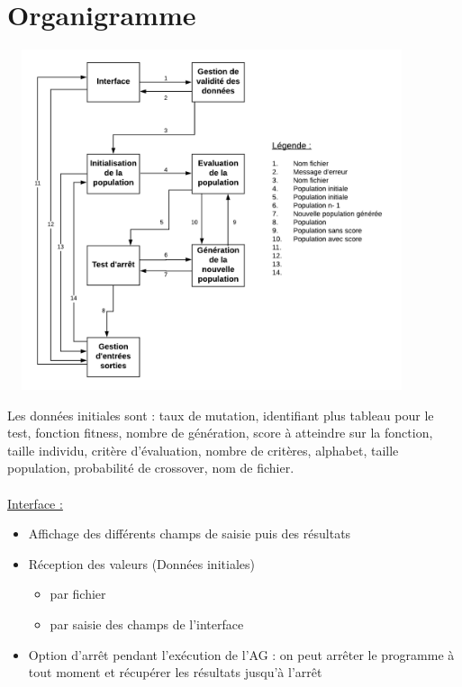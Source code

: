 \documentclass[a4paper,11pt]{article}
\begin{document}
	\section{Organigramme}
		\centerline{\includegraphics[width = 12cm,height = 10cm]{OrganigrammeV4.png}}
		
		Les données initiales sont : 	taux de mutation, 
										identifiant plus tableau pour le test, 
										fonction fitness, 
										nombre de génération, 
										score à atteindre sur la fonction, 
										taille individu, 
										critère d’évaluation, 
										nombre de critères, 
										alphabet, 
										taille population, probabilité de crossover, 
										nom de fichier.\\
		\\
		\underline{Interface :}
			\begin{itemize}
			\item Affichage des différents champs de saisie puis des résultats
			\item Réception des valeurs (Données initiales)
				\begin{itemize}
				\item par fichier
				\item par saisie des champs de l'interface
				\end{itemize}
			\item Option d’arrêt pendant l'exécution de l’AG : on peut arrêter le programme à tout moment et récupérer les résultats jusqu’à l’arrêt\\
			\end{itemize}
		
\end{document}
